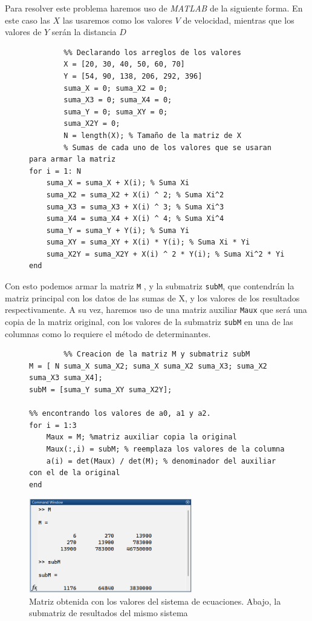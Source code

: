 \documentclass[11pt,letterpaper]{article}
\begin{document}
Para resolver este problema haremos uso de \emph{MATLAB} de la siguiente forma. En este caso las $X$ las usaremos como los valores $V$ de velocidad, mientras que los valores de $Y$ serán la distancia $D$
\begin{figure}[H]
\begin{tcolorbox}[title=Problema 4: Implementación en MATLAB]
	\begin{verbatim}
		%% Declarando los arreglos de los valores
		X = [20, 30, 40, 50, 60, 70]
		Y = [54, 90, 138, 206, 292, 396]
		suma_X = 0; suma_X2 = 0;
		suma_X3 = 0; suma_X4 = 0;
		suma_Y = 0; suma_XY = 0;
		suma_X2Y = 0;
		N = length(X); % Tamaño de la matriz de X
		% Sumas de cada uno de los valores que se usaran para armar la matriz 
for i = 1: N
    suma_X = suma_X + X(i); % Suma Xi
    suma_X2 = suma_X2 + X(i) ^ 2; % Suma Xi^2
    suma_X3 = suma_X3 + X(i) ^ 3; % Suma Xi^3
    suma_X4 = suma_X4 + X(i) ^ 4; % Suma Xi^4
    suma_Y = suma_Y + Y(i); % Suma Yi
    suma_XY = suma_XY + X(i) * Y(i); % Suma Xi * Yi
    suma_X2Y = suma_X2Y + X(i) ^ 2 * Y(i); % Suma Xi^2 * Yi
end
\end{verbatim}
\end{tcolorbox}
\end{figure}
Con esto podemos armar la matriz  \texttt{M} , y la submatriz \texttt{subM}, que contendrán la matriz principal con los datos de las sumas de X, y los valores de los resultados respectivamente. A su vez, haremos uso de una matriz auxiliar \texttt{Maux} que será una copia de la matriz original, con los valores de la submatriz \texttt{subM} en una de las columnas como lo requiere el método de determinantes.
\begin{figure}[H]
\begin{tcolorbox}[ title=Problema 4: Implementación en MATLAB]
		\begin{verbatim}
		%% Creacion de la matriz M y submatriz subM
M = [ N suma_X suma_X2; suma_X suma_X2 suma_X3; suma_X2 suma_X3 suma_X4];
subM = [suma_Y suma_XY suma_X2Y];

%% encontrando los valores de a0, a1 y a2.
for i = 1:3
    Maux = M; %matriz auxiliar copia la original
    Maux(:,i) = subM; % reemplaza los valores de la columna
    a(i) = det(Maux) / det(M); % denominador del auxiliar con el de la original
end
\end{verbatim}
\end{tcolorbox}
\end{figure}
\begin{figure}[H]
\centering
\includegraphics[width=2.8in]{mtz4.png}
\caption{Matriz obtenida con los valores del sistema de ecuaciones. Abajo, la submatriz de resultados del mismo sistema}
\label{figure:mtz4}
\end{figure}
\end{document}
